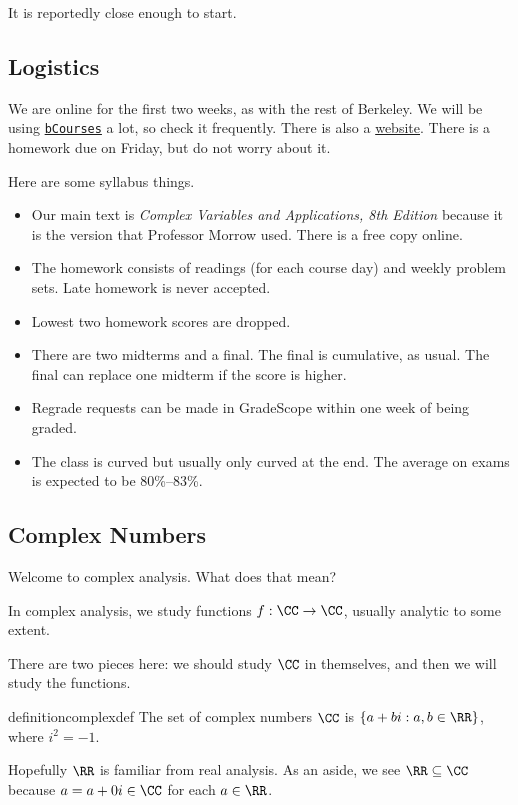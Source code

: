 
It is reportedly close enough to start.

\subsection{Logistics}
We are online for the first two weeks, as with the rest of Berkeley. We will be using \href{https://bcourses.berkeley.edu/courses/1511845}{\texttt{bCourses}} a lot, so check it frequently. There is also a \href{https://sites.google.com/view/ucb-math185-005-spring2022/home}{website}. There is a homework due on Friday, but do not worry about it.

Here are some syllabus things.
\begin{itemize}
	\item Our main text is \textit{Complex Variables and Applications, 8th Edition} because it is the version that Professor Morrow used. There is a free copy online.
	\item The homework consists of readings (for each course day) and weekly problem sets. Late homework is never accepted.
	\item Lowest two homework scores are dropped.
	\item There are two midterms and a final. The final is cumulative, as usual. The final can replace one midterm if the score is higher.
	\item Regrade requests can be made in GradeScope within one week of being graded.
	\item The class is curved but usually only curved at the end. The average on exams is expected to be 80\%--83\%.
\end{itemize}

\subsection{Complex Numbers}
Welcome to complex analysis. What does that mean?
\begin{idea}
	In complex analysis, we study functions $f:\CC\to\CC$, usually analytic to some extent.
\end{idea}
There are two pieces here: we should study $\CC$ in themselves, and then we will study the functions.
\begin{restatable}{definition}{complexdef}
	The set of complex numbers $\CC$ is $\{a+bi:a,b\in\RR\}$, where $i^2=-1$.
\end{restatable}
\noindent Hopefully $\RR$ is familiar from real analysis. As an aside, we see $\RR\subseteq\CC$ because $a=a+0i\in\CC$ for each $a\in\RR$.

